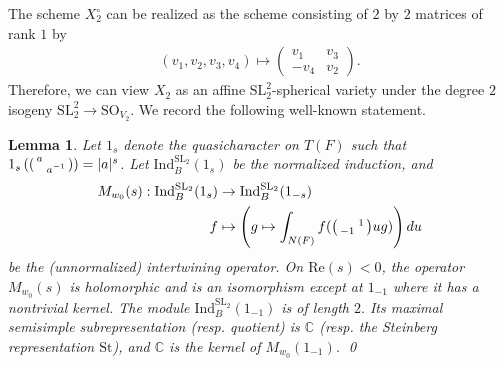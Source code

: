 \documentclass[11pt,a4paper,reqno]{amsart}
\newtheorem{lem}[thm]{Lemma}
\theoremstyle{remark}
\numberwithin{equation}{section}
\newcommand{\SL}{\mathrm{SL}}
\newcommand{\CC}{\mathbb{C}}
\theoremstyle{definition}
\numberwithin{equation}{section}
\newenvironment{psmatrix}
  {\left(\begin{smallmatrix}}
  {\end{smallmatrix}\right)}
\begin{document}
The scheme $X_2^\circ$ can be realized as the scheme consisting of $2$ by $2$ matrices of rank $1$ by
\begin{align*}
   (v_1,v_2,v_3,v_4)\longmapsto \begin{pmatrix}
        v_1 & v_3\\
        -v_4 & v_2
    \end{pmatrix}.
\end{align*}
Therefore, we can view $X_{2}$ as an affine $\SL_2^2$-spherical variety under the degree $2$ isogeny $\SL_2^2\to \mathrm{SO}_{V_2}.$ We record the following well-known statement. 

\begin{lem}\label{lem:sl2} Let $1_s$ denote the quasicharacter on $T(F)$ such that $1_{s}\left(\begin{psmatrix}
a &\\
 & a^{-1}
\end{psmatrix}\right)=|a|^{s}$. Let $\mathrm{Ind}_{B}^{\SL_2}(1_{s})$ be the normalized induction, and
\begin{align*}
    M_{w_0}(s):\mathrm{Ind}_{B}^{\SL_2}(1_{s})&\to \mathrm{Ind}_{B}^{\SL_2}(1_{-s})\\
    f&\mapsto \left(g\mapsto \int_{N(F)} f(\begin{psmatrix}
 & 1\\
-1 & 
\end{psmatrix}ug)\right)du 
\end{align*}
be the (unnormalized) intertwining operator. On $\mathrm{Re}(s)<0$, the operator $M_{w_0}(s)$ is holomorphic and is an isomorphism except at $1_{-1}$ where it has a nontrivial kernel. The module $\mathrm{Ind}_{B}^{\SL_2}(1_{-1})$ is of length $2.$ Its maximal semisimple subrepresentation (resp. quotient) is $\CC$ (resp. the Steinberg representation $\mathrm{St}$), and $\CC$ is the kernel of $M_{w_0}(1_{-1})$.
\qed
\end{lem}
\end{document}
